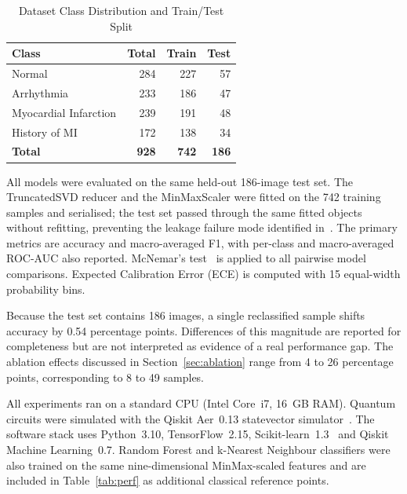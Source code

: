 \documentclass[10pt,conference]{IEEEtran}
\begin{document}
\begin{table}[t]
\caption{Dataset Class Distribution and Train/Test Split}
\label{tab:dataset}
\centering
\renewcommand{\arraystretch}{1.1}
\begin{tabular}{lrrr}
\toprule
Class & Total & Train & Test\\
\midrule
Normal              & 284 & 227 & 57\\
Arrhythmia          & 233 & 186 & 47\\
Myocardial Infarction & 239 & 191 & 48\\
History of MI       & 172 & 138 & 34\\
\midrule
\textbf{Total}      & \textbf{928} & \textbf{742} & \textbf{186}\\
\bottomrule
\end{tabular}
\end{table}

All models were evaluated on the same held-out 186-image test set. The
TruncatedSVD reducer and the MinMaxScaler were fitted on the 742
training samples and serialised; the test set passed through the same
fitted objects without refitting, preventing the leakage failure mode
identified in~\cite{vasquez2024}. The primary metrics are accuracy and
macro-averaged F1, with per-class and macro-averaged ROC-AUC also
reported. McNemar's test~\cite{mcnemar1947} is applied to all pairwise
model comparisons. Expected Calibration Error (ECE) is computed with
15 equal-width probability bins.

Because the test set contains 186 images, a single reclassified sample
shifts accuracy by 0.54 percentage points. Differences of this
magnitude are reported for completeness but are not interpreted as
evidence of a real performance gap. The ablation effects discussed in
Section~\ref{sec:ablation} range from 4 to 26 percentage points,
corresponding to 8 to 49 samples.

All experiments ran on a standard CPU (Intel Core~i7, 16~GB RAM).
Quantum circuits were simulated with the Qiskit Aer~0.13 statevector
simulator~\cite{qiskit2023}. The software stack uses Python~3.10,
TensorFlow~2.15, Scikit-learn~1.3~\cite{sklearn} and Qiskit Machine
Learning~0.7. Random Forest and k-Nearest Neighbour classifiers were
also trained on the same nine-dimensional MinMax-scaled features and
are included in Table~\ref{tab:perf} as additional classical reference
points.
\end{document}
